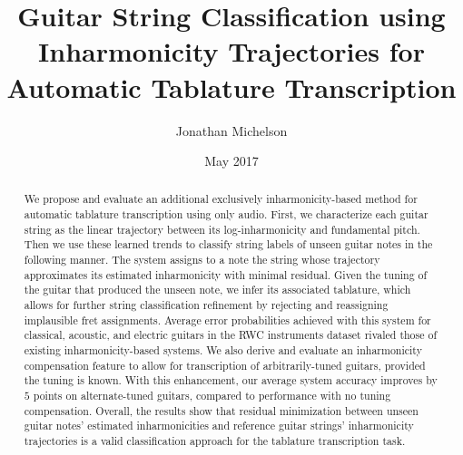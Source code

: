 \documentclass[12pt]{cmuthesis}
\begin{document}
 
\frontmatter

\pagestyle{empty}

\title{ %
{\bf Guitar String Classification using Inharmonicity Trajectories for Automatic Tablature Transcription}}
\author{Jonathan Michelson}
\date{May 2017}
\trnumber{}


\support{}
\disclaimer{}



\maketitle


\pagestyle{plain} %


\begin{abstract}
We propose and evaluate an additional exclusively inharmonicity-based method for automatic tablature transcription using only audio. First, we characterize each guitar string as the linear trajectory between its log-inharmonicity and fundamental pitch. Then we use these learned trends to classify string labels of unseen guitar notes in the following manner. The system assigns to a note the string whose trajectory approximates its estimated inharmonicity with minimal residual. Given the tuning of the guitar that produced the unseen note, we infer its associated tablature, which allows for further string classification refinement by rejecting and reassigning implausible fret assignments. Average error probabilities achieved with this system for classical, acoustic, and electric guitars in the RWC instruments dataset rivaled those of existing inharmonicity-based systems. We also derive and evaluate an inharmonicity compensation feature to allow for transcription of arbitrarily-tuned guitars, provided the tuning is known. With this enhancement, our average system accuracy improves by $5$ points on alternate-tuned guitars, compared to performance with no tuning compensation. Overall, the results show that residual minimization between unseen guitar notes' estimated inharmonicities and reference guitar strings' inharmonicity trajectories is a valid classification approach for the tablature transcription task.

\end{abstract}
\end{document}
